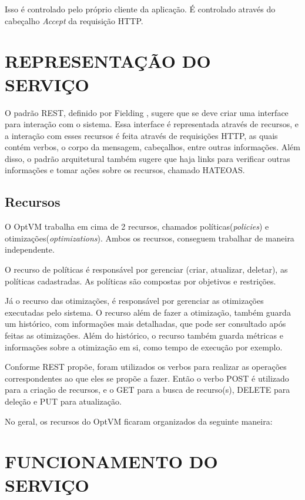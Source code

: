 Isso é controlado pelo próprio cliente da aplicação. É controlado através do cabeçalho \textit{Accept}
da requisição HTTP.

\section{REPRESENTAÇÃO DO SERVIÇO}

O padrão REST, definido por Fielding \cite{fielding}, sugere que se deve criar uma interface para interação com o sistema. 
Essa interface é representada através de recursos, e a interação com esses recursos é feita através de requisições HTTP, 
as quais contém verbos, o corpo da mensagem, cabeçalhos, entre outras informações. Além disso, o padrão arquitetural também sugere que 
haja links para verificar outras informações e tomar ações sobre os recursos, chamado HATEOAS.

\subsection{Recursos}

O OptVM trabalha em cima de 2 recursos, chamados políticas(\textit{policies}) e otimizações(\textit{optimizations}). 
Ambos os recursos, conseguem trabalhar de maneira independente.

O recurso de políticas é responsável por gerenciar (criar, atualizar, deletar), as políticas
cadastradas. As políticas são compostas por objetivos e restrições. 

Já o recurso das otimizações, é responsável por gerenciar as otimizações executadas pelo sistema. O recurso 
além de fazer a otimização, também guarda um histórico, com informações mais detalhadas, 
que pode ser consultado após feitas as otimizações. Além do histórico, o recurso também guarda métricas e informações sobre
a otimização em si, como tempo de execução por exemplo.

Conforme REST propõe, foram utilizados os verbos para realizar as operações correspondentes
ao que eles se propõe a fazer. Então o verbo POST é utilizado para a criação de recursos,
e o GET para a busca de recurso(s), DELETE para deleção e PUT para atualização.

No geral, os recursos do OptVM ficaram organizados da seguinte maneira:





\section{FUNCIONAMENTO DO SERVIÇO}

